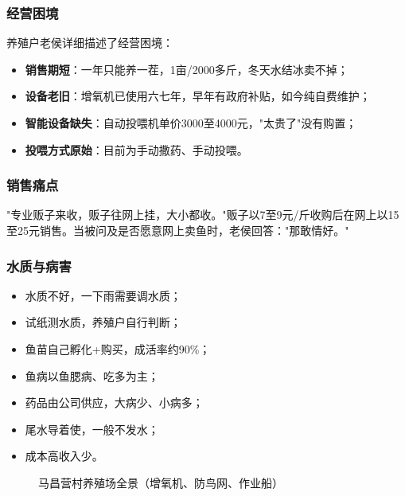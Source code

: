 \documentclass[12pt,a4paper]{article}
\begin{document}
\subsubsection{经营困境}

养殖户老侯详细描述了经营困境：
\begin{itemize}[leftmargin=2em]
    \item \textbf{销售期短}：一年只能养一茬，1亩/2000多斤，冬天水结冰卖不掉；
    \item \textbf{设备老旧}：增氧机已使用六七年，早年有政府补贴，如今纯自费维护；
    \item \textbf{智能设备缺失}：自动投喂机单价3000至4000元，"太贵了"没有购置；
    \item \textbf{投喂方式原始}：目前为手动撒药、手动投喂。
\end{itemize}

\subsubsection{销售痛点}

"专业贩子来收，贩子往网上挂，大小都收。"贩子以7至9元/斤收购后在网上以15至25元销售。当被问及是否愿意网上卖鱼时，老侯回答："那敢情好。"

\subsubsection{水质与病害}

\begin{itemize}[leftmargin=2em]
    \item 水质不好，一下雨需要调水质；
    \item 试纸测水质，养殖户自行判断；
    \item 鱼苗自己孵化+购买，成活率约90\%；
    \item 鱼病以鱼腮病、吃多为主；
    \item 药品由公司供应，大病少、小病多；
    \item 尾水导着使，一般不发水；
    \item 成本高收入少。
\end{itemize}

\begin{figure}[H]
\centering
{}
\caption{马昌营村养殖场全景（增氧机、防鸟网、作业船）}
\end{figure}
\end{document}

